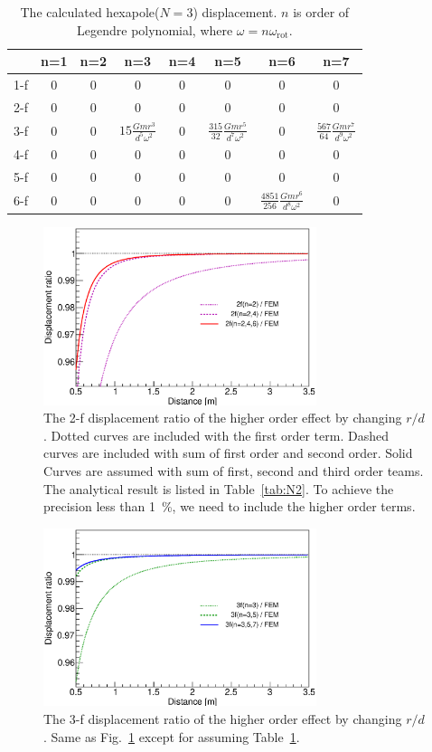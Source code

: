 \documentclass[%
 reprint,
superscriptaddress,
 amsmath,amssymb,
 aps,
]{revtex4-1}
\begin{document}
\begin{table}
\begin{center}
\caption{The calculated hexapole($N=3$) displacement. $n$ is order of Legendre polynomial, where $\omega=n\omega_{\mathrm{rot}}$.  \label{tab:N3}}
\footnotesize
\begin{tabular}{cccccccc}
\hline
& n=1 & n=2& n=3 &n=4&n=5&n=6&n=7 \\
\hline
1-f&0&0&0&0&0&0&0 \\
2-f&0&0&0&0&0&0&0  \\
3-f&0&0&$15\frac{Gmr^3}{d^5\omega^2}$&0&$\frac{315}{32}\frac{Gmr^5}{d^7\omega^2}$&0& $\frac{567}{64} \frac{Gmr^7}{d^9 \omega^2}$\\
4-f&0&0&0&0&0&0&0 \\
5-f&0&0&0&0&0&0&0 \\
6-f&0&0&0&0&0&$\frac{4851}{256} \frac{Gmr^6}{d^8\omega^2}$&0  \\
\hline
\end{tabular}
\end{center}
\end{table}

\begin{figure}
\begin{center}
\includegraphics[width=8cm]{2f.eps}
\caption{The 2-f displacement ratio of the higher order effect by changing $r/d$. Dotted curves are included with the first order term. Dashed curves are included with sum of first order and second order. Solid Curves are assumed with sum of first, second and third order teams. The analytical result is listed in Table~\ref{tab:N2}. To achieve the precision less than 1~\%, we need to include the higher order terms.}
\label{fig:FEM-2f}
\end{center}
\end{figure}

\begin{figure}
\begin{center}
\includegraphics[width=8cm]{3f.eps}
\caption{The 3-f displacement ratio of the higher order effect by changing $r/d$. Same as Fig.~\ref{fig:FEM-2f} except for assuming Table~\ref{tab:N3}. }
\label{fig:FEM-3f}
\end{center}
\end{figure}
\end{document}
